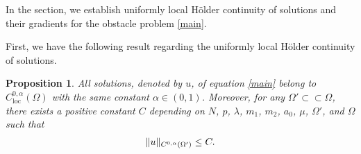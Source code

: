 \documentclass[onecolumn]{autart}
\newtheorem{proposition}{Proposition}
\begin{document}
	In the section, we establish uniformly local H\"older continuity of  solutions and their gradients for the obstacle problem \eqref{main}.
	
	
	
	
	First, we have the following result regarding the uniformly local H\"older continuity of  solutions.
	\begin{proposition}\label{C^0} All solutions, denoted by  $u$, of equation \eqref{main} belong to $C_{\mathrm{loc}}^{0, \alpha}(\Omega)$ with the same constant $\alpha \in (0, 1)$. Moreover,  for any $\Omega' \subset \subset \Omega$, there exists a positive constant $C$ depending on $N$, $p$, $\lambda$, $m_1$, $m_2$, $a_0$, $\mu$, $\Omega'$, and $\Omega$ such that
		\begin{align}
			\|u\|_{C^{0,\alpha}(\Omega')} \leq C.\notag
		\end{align}
	\end{proposition}
	
\end{document}
